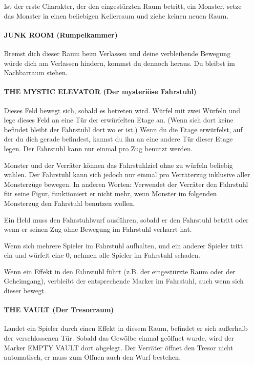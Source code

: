 Ist der erste Charakter, der den eingestürzten Raum betritt, ein Monster, setze das Monster in einen beliebigen Kellerraum und ziehe keinen neuen Raum.

\paragraph{JUNK ROOM (Rumpelkammer)}

Bremst dich dieser Raum beim Verlassen und deine verbleibende Bewegung würde dich am Verlassen hindern, kommst du dennoch heraus. Du bleibst im Nachbarraum stehen.

\paragraph{THE MYSTIC ELEVATOR (Der mysteriöse Fahrstuhl)}

Dieses Feld bewegt sich, sobald es betreten wird. Würfel mit zwei Würfeln und lege dieses Feld an eine Tür der erwürfelten Etage an. (Wenn sich dort keine befindet bleibt der Fahrstuhl dort wo er ist.) Wenn du die Etage erwürfelst, auf der du dich gerade befindest, kannst du ihn an eine andere Tür dieser Etage legen. Der Fahrstuhl kann nur einmal pro Zug benutzt werden.

Monster und der Verräter können das Fahrstuhlziel ohne zu würfeln beliebig wählen. Der Fahrstuhl kann sich jedoch nur einmal pro Verräterzug inklusive aller Monsterzüge bewegen. In anderen Worten: Verwendet der Verräter den Fahrstuhl für seine Figur, funktioniert er nicht mehr, wenn Monster im folgenden Monsterzug den Fahrstuhl benutzen wollen.

Ein Held muss den Fahrstuhlwurf ausführen, sobald er den Fahrstuhl betritt oder wenn er seinen Zug ohne Bewegung im Fahrstuhl verharrt hat.

Wenn sich mehrere Spieler im Fahrstuhl aufhalten, und ein anderer Spieler tritt ein und würfelt eine 0, nehmen alle Spieler im Fahrstuhl schaden.

Wenn ein Effekt in den Fahrstuhl führt (z.B. der eingestürzte Raum oder der Geheimgang), verbleibt der entsprechende Marker im Fahrstuhl, auch wenn sich dieser bewegt.

\paragraph{THE VAULT (Der Tresorraum)}

Landet ein Spieler durch einen Effekt in diesem Raum, befindet er sich außerhalb der verschlossenen Tür. Sobald das Gewölbe einmal geöffnet wurde, wird der Marker EMPTY VAULT dort abgelegt. Der Verräter öffnet den Tresor nicht automatisch, er muss zum Öffnen auch den Wurf bestehen.

